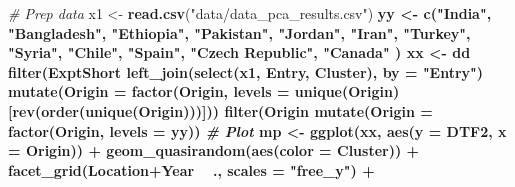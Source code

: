 \documentclass[
]{article}
\newenvironment{Shaded}{\begin{snugshade}}{\end{snugshade}}
\newcommand{\CommentTok}[1]{\textcolor[rgb]{0.56,0.35,0.01}{\textit{#1}}}
\newcommand{\DataTypeTok}[1]{\textcolor[rgb]{0.13,0.29,0.53}{#1}}
\newcommand{\KeywordTok}[1]{\textcolor[rgb]{0.13,0.29,0.53}{\textbf{#1}}}
\newcommand{\NormalTok}[1]{#1}
\newcommand{\OperatorTok}[1]{\textcolor[rgb]{0.81,0.36,0.00}{\textbf{#1}}}
\newcommand{\StringTok}[1]{\textcolor[rgb]{0.31,0.60,0.02}{#1}}
\begin{document}
\begin{Shaded}
\begin{Highlighting}[]
\CommentTok{# Prep data}
\NormalTok{x1 <-}\StringTok{ }\KeywordTok{read.csv}\NormalTok{(}\StringTok{"data/data_pca_results.csv"}\NormalTok{) }\OperatorTok{%
\NormalTok{yy <-}\StringTok{ }\KeywordTok{c}\NormalTok{(}\StringTok{"India"}\NormalTok{, }\StringTok{"Bangladesh"}\NormalTok{, }\StringTok{"Ethiopia"}\NormalTok{, }\StringTok{"Pakistan"}\NormalTok{, }\StringTok{"Jordan"}\NormalTok{,}
        \StringTok{"Iran"}\NormalTok{, }\StringTok{"Turkey"}\NormalTok{, }\StringTok{"Syria"}\NormalTok{, }\StringTok{"Chile"}\NormalTok{, }\StringTok{"Spain"}\NormalTok{, }\StringTok{"Czech Republic"}\NormalTok{, }\StringTok{"Canada"}\NormalTok{ )}
\NormalTok{xx <-}\StringTok{ }\NormalTok{dd }\OperatorTok{%
\StringTok{  }\KeywordTok{filter}\NormalTok{(ExptShort }\OperatorTok{%
\StringTok{  }\KeywordTok{left_join}\NormalTok{(}\KeywordTok{select}\NormalTok{(x1, Entry, Cluster), }\DataTypeTok{by =} \StringTok{"Entry"}\NormalTok{) }\OperatorTok{%
\StringTok{  }\KeywordTok{mutate}\NormalTok{(}\DataTypeTok{Origin =} \KeywordTok{factor}\NormalTok{(Origin, }\DataTypeTok{levels =} \KeywordTok{unique}\NormalTok{(Origin)[}\KeywordTok{rev}\NormalTok{(}\KeywordTok{order}\NormalTok{(}\KeywordTok{unique}\NormalTok{(Origin)))])) }\OperatorTok{%
\StringTok{  }\KeywordTok{filter}\NormalTok{(Origin }\OperatorTok{%
\StringTok{  }\KeywordTok{mutate}\NormalTok{(}\DataTypeTok{Origin =} \KeywordTok{factor}\NormalTok{(Origin, }\DataTypeTok{levels =}\NormalTok{ yy))}
\CommentTok{# Plot}
\NormalTok{mp <-}\StringTok{ }\KeywordTok{ggplot}\NormalTok{(xx, }\KeywordTok{aes}\NormalTok{(}\DataTypeTok{y =}\NormalTok{ DTF2, }\DataTypeTok{x =}\NormalTok{ Origin)) }\OperatorTok{+}\StringTok{ }
\StringTok{  }\KeywordTok{geom_quasirandom}\NormalTok{(}\KeywordTok{aes}\NormalTok{(}\DataTypeTok{color =}\NormalTok{ Cluster)) }\OperatorTok{+}\StringTok{ }
\StringTok{  }\KeywordTok{facet_grid}\NormalTok{(Location}\OperatorTok{+}\NormalTok{Year }\OperatorTok{~}\StringTok{ }\NormalTok{., }\DataTypeTok{scales =} \StringTok{"free_y"}\NormalTok{) }\OperatorTok{+}
}}}}}}
\end{Highlighting}
\end{Shaded}
\end{document}
